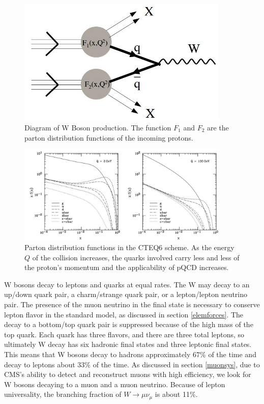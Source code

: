 \documentclass[oneside, letterpaper, oldfontcommands]{memoir}
\begin{document}
\begin{figure}[here]
\includegraphics[width=0.9\textwidth]{WFormation.jpg}
\caption{Diagram of W Boson production. The function $F_{1}$ and $F_{2}$ are the parton distribution functions of the incoming protons.}
\label{fig:WFormation}
\end{figure}

\begin{figure}[here]
\includegraphics[width=0.9\textwidth]{cteq6PDF.jpg}
\caption{Parton distribution functions in the CTEQ6 scheme\cite{Pumplin:2002vw}. As the energy $Q$ of the collision increases, the quarks involved carry less and less of the proton's momentum and the applicability of pQCD increases.}
\label{fig:cteq6PDF}
\end{figure}

\qquad W bosons decay to leptons and quarks at equal rates. The W may decay to an up/down quark pair, a charm/strange quark pair, or a lepton/lepton neutrino pair. The presence of the muon neutrino in the final state is necessary to conserve lepton flavor in the standard model, as discussed in section \ref{elemforces}.  The decay to a bottom/top quark pair is suppressed because of the high mass of the top quark. Each quark has three flavors, and there are three total leptons, so ultimately W decay has six hadronic final states and three leptonic final states. This means that W bosons decay to hadrons approximately 67$\%$ of the time and decay to leptons about $33\%$ of the time. As discussed in section \ref{muonsys}, due to CMS's ability to detect and reconstruct muons with high efficiency, we look for W bosons decaying to a muon and a muon neutrino. Because of lepton universality, the branching fraction of $W \rightarrow \mu\nu_{\mu}$ is about 11$\%$. 
\end{document}
